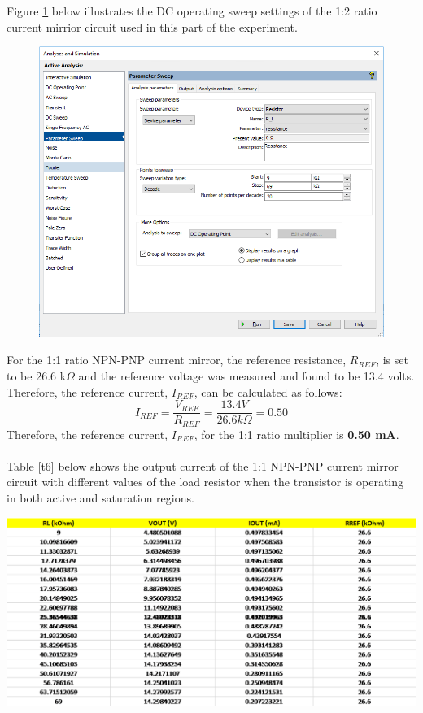 \documentclass{article}
\begin{document}
	\noindent Figure \ref{f19} below illustrates the DC operating sweep settings of the 1:2 ratio current mirrior circuit used in this part of the experiment.
	\begin{figure}[!ht]
		\centering
		\includegraphics[width=0.64\linewidth]{d1-part3-DcOperatingSweep.png}
		\label{f19}
	\end{figure}
	
	\pagebreak
	
	\noindent For the 1:1 ratio NPN-PNP current mirror, the reference resistance, $R_{REF}$, is set to be 26.6 k$\Omega$ and the reference voltage was measured and found to be 13.4 volts.
	Therefore, the reference current, $I_{REF}$, can be calculated as follows: $$I_{REF} = \frac{V_{REF}}{R_{REF}} = \frac{13.4 V}{26.6 k\Omega} = 0.50$$
	Therefore, the reference current, $I_{REF}$, for the 1:1 ratio multiplier is \textbf{0.50 mA}.\\\\
	Table \ref{t6} below shows the output current of the 1:1 NPN-PNP current mirror circuit with different values of the load resistor when the transistor is operating in both active and saturation regions.
	\begin{table}[!ht]
		\centering
		\label{t6}
		\includegraphics[width=\linewidth]{part3-data-measured-npn_pnp-1_1.png}
	\end{table}
\end{document}
